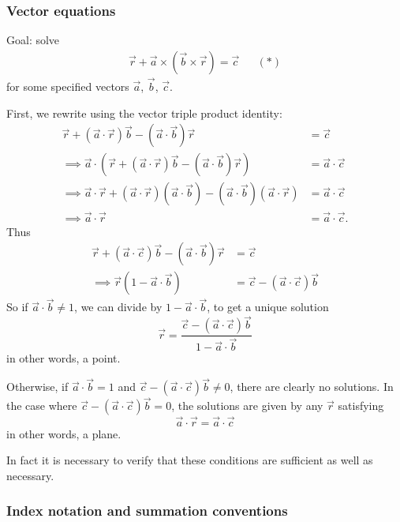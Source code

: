 \documentclass{../template/note}
\begin{document}
    \subsubsection{Vector equations}

    Goal: solve
    \begin{align*}
        \vec r + \vec a \times (\vec b \times \vec r) = \vec c && (*)
    \end{align*}
    for some specified vectors \(\vec a\), \(\vec b\), \(\vec c\).

    First, we rewrite using the vector triple product identity:
    \begin{align*}
        \vec r + (\vec a \cdot \vec r)\vec b - (\vec a \cdot \vec b) \vec r &= \vec c \\
        \implies \vec a \cdot \left(\vec r + (\vec a \cdot \vec r)\vec b - (\vec a \cdot \vec b) \vec r\right) &= \vec a \cdot \vec c \\
        \implies \vec a \cdot \vec r + (\vec a \cdot \vec r)(\vec a \cdot \vec b) - (\vec a \cdot \vec b)(\vec a \cdot \vec r) &= \vec a \cdot \vec c \\
        \implies \vec a \cdot \vec r &= \vec a \cdot \vec c.
    \end{align*}
    Thus
    \begin{align*}
        \vec r + (\vec a \cdot \vec c)\vec b - (\vec a \cdot \vec b) \vec r &= \vec c \\
        \implies \vec r (1 - \vec a \cdot \vec b) &= \vec c - (\vec a \cdot \vec c) \vec b
    \end{align*}
    So if \(\vec a \cdot \vec b \neq 1\), we can divide by \(1 - \vec a \cdot \vec b\), to get a unique solution
    \[
        \vec r = \frac{\vec c - (\vec a \cdot \vec c) \vec b}{1 - \vec a \cdot \vec b}
    \]
    in other words, a point.

    Otherwise, if \(\vec a \cdot \vec b = 1\) and \(\vec c - (\vec a \cdot \vec c)\vec b \neq 0\), there are clearly no solutions. In the case where \(\vec c - (\vec a \cdot \vec c)\vec b = 0\), the solutions are given by any \(\vec r\) satisfying
    \[
        \vec a \cdot \vec r = \vec a \cdot \vec c
    \]
    in other words, a plane. 

    In fact it is necessary to verify that these conditions are sufficient as well as necessary.

    \subsubsection{Index notation and summation conventions}
\end{document}
